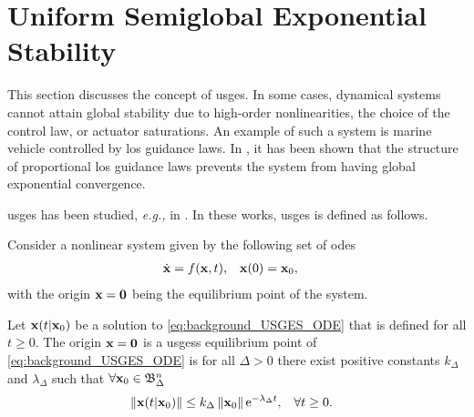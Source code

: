 \section{Uniform Semiglobal Exponential Stability}
\label{sec:background_USGES}

This section discusses the concept of \gls{usges}.
In some cases, dynamical systems cannot attain global stability due to high-order nonlinearities, the choice of the control law, or actuator saturations.
An example of such a system is marine vehicle controlled by \acrlong{los} guidance laws.
In \cite{fossen_uniform_2014}, it has been shown that the structure of proportional \gls{los} guidance laws prevents the system from having global exponential convergence.

\Acrlong{usges} has been studied, \emph{e.g.,} in \cite{loria_cascaded_2005,pettersen_lyapunov_2017}.
In these works, \gls{usges} is defined as follows.

\begin{dfn}
    Consider a nonlinear system given by the following set of \glspl{ode}
    \begin{align}
        \dot{\mathbf{x}} &= f(\mathbf{x}, t), &
        \mathbf{x}(0) &= \mathbf{x}_0,
        \label{eq:background_USGES_ODE}
    \end{align}
    with the origin $\mathbf{x} = \mathbf{0}$ being the equilibrium point of the system.

    Let $\mathbf{x}(t | \mathbf{x}_0)$ be a solution to \eqref{eq:background_USGES_ODE} that is defined for all $t \geq 0$.
    The origin $\mathbf{x} = \mathbf{0}$ is a \glspl{usges} equilibrium point of \eqref{eq:background_USGES_ODE} is for all $\Delta > 0$ there exist positive constants $k_{\Delta}$ and $\lambda_{\Delta}$ such that $\forall \mathbf{x}_0 \in \mathfrak{B}_{\Delta}^n$
    \begin{align}
        &\left\|\mathbf{x}(t | \mathbf{x}_0)\right\| \leq k_{\Delta} \left\|\mathbf{x}_0\right\| {\rm e}^{-\lambda_{\Delta}t},&
        &\forall t \geq 0.
    \end{align}
\end{dfn}
